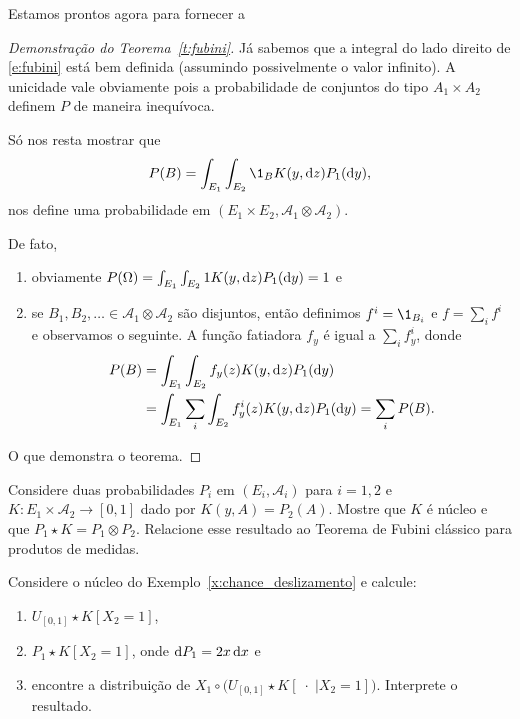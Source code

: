 Estamos prontos agora para fornecer a
\begin{proof}[Demonstração do Teorema~\ref{t:fubini}]
  Já sabemos que a integral do lado direito de \eqref{e:fubini} está bem definida (assumindo possivelmente o valor infinito).
  A unicidade vale obviamente pois a probabilidade de conjuntos do tipo $A_1 \times A_2$ definem $P$ de maneira inequívoca.


  Só nos resta mostrar que
  \begin{equation}
    P(B) = \int_{E_1} \int_{E_2} \1_{B} K(y, \d z) P_1 (\d y),
  \end{equation}
  nos define uma probabilidade em $(E_1 \times E_2, \mathcal{A}_1 \otimes \mathcal{A}_2)$.

  De fato,
  \begin{enumerate}[\quad a)]
  \item obviamente $P(\Omega) = \int_{E_1} \int_{E_2} 1 K(y, \mathop{}\!\mathrm{d} z) P_1(\mathop{}\!\mathrm{d} y) = 1$ e
  \item se $B_1, B_2, \dots \in \mathcal{A}_1 \otimes \mathcal{A}_2$ são disjuntos, então definimos $f^i = \1_{B_i}$ e $f = \sum_i f^i$ e observamos o seguinte.
    A função fatiadora $f_y$ é igual a $\sum_i f^i_y$, donde
    \begin{equation}
      \begin{split}
        P(B) & = \int_{E_1} \int_{E_2} f_y(z) K(y, \mathop{}\!\mathrm{d} z) P_1(\mathop{}\!\mathrm{d} y)\\
        & = \int_{E_1} \sum_i \int_{E_2} f^i_y(z) K(y, \mathop{}\!\mathrm{d} z) P_1(\mathop{}\!\mathrm{d} y) = \sum_i P(B).
      \end{split}
    \end{equation}
  \end{enumerate}
  O que demonstra o teorema.
\end{proof}

\begin{exercise}
  \label{x:nucleo_constante}
  Considere duas probabilidades $P_i$ em $(E_i, \mathcal{A}_i)$ para $i = 1,2$ e $K:E_1 \times \mathcal{A}_2 \to [0,1]$ dado por $K(y,A) = P_2(A)$.
  Mostre que $K$ é núcleo e que $P_1 \star K = P_1 \otimes P_2$.
  Relacione esse resultado ao Teorema de Fubini clássico para produtos de medidas.
\end{exercise}

\begin{exercise}
  Considere o núcleo do Exemplo~\ref{x:chance_deslizamento} e calcule:
  \begin{enumerate}[\quad a)]
  \item $U_{[0,1]} \star K [X_2 = 1]$,
  \item $P_1 \star K [X_2 = 1]$, onde $\mathop{}\!\mathrm{d} P_1 = 2x \mathop{}\!\mathrm{d} x$ e
  \item encontre a distribuição de $X_1 \circ \big( U_{[0,1]} \star K [\; \cdot \; | X_2 = 1] \big)$. Interprete o resultado.
  \end{enumerate}
\end{exercise}

